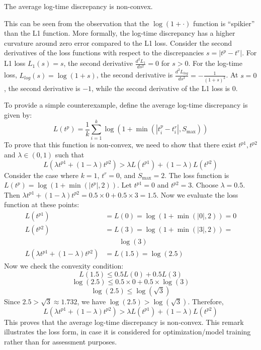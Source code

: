 \begin{ChSixRemark}
    The average log-time discrepancy is non-convex.
\end{ChSixRemark}
This can be seen from the observation that the $\log(1+\cdot)$ function is ``spikier'' than the L1 function.
More formally, the log-time discrepancy has a higher curvature around zero error compared to the L1 loss.
Consider the second derivatives of the loss functions with respect to the discrepancies $s = |t^p - t^r|$.
For L1 loss $L_1(s) = s$, the second derivative $\frac{d^2 L_1}{ds^2} = 0$ for $s > 0$.
For the log-time loss, $L_{log}(s) = \log(1 + s)$, the second derivative is $\frac{d^2 L_{log}}{ds^2} = -\frac{1}{(1 + s)^2}$.
At $s = 0$, the second derivative is $-1$, while the second derivative of the L1 loss is $0$.

To provide a simple counterexample, define the average log-time discrepancy is given by:
\[
L(t^p) = \frac{1}{k} \sum_{i=1}^k \log(1 + \min(|t^p_i - t^r_i|, S_{\text{max}}))
\]
To prove that this function is non-convex, we need to show that there exist $t^{p1}, t^{p2}$ and $\lambda \in (0,1)$ such that
\[
L(\lambda t^{p1} + (1-\lambda) t^{p2}) > \lambda L(t^{p1}) + (1-\lambda) L(t^{p2})
\]
Consider the case where $k=1$, $t^r = 0$, and $S_{\text{max}} = 2$.
The loss function is $L(t^p) = \log(1 + \min(|t^p|, 2))$.
Let $t^{p1} = 0$ and $t^{p2} = 3$.
Choose $\lambda = 0.5$.
Then $\lambda t^{p1} + (1-\lambda) t^{p2} = 0.5 \times 0 + 0.5 \times 3 = 1.5$.
Now we evaluate the loss function at these points:
\begin{align*}
L(t^{p1}) &= L(0) = \log(1 + \min(|0|, 2)) = 0 \\
L(t^{p2}) &= L(3) = \log(1 + \min(|3|, 2)) = \\
    & \qquad \log(3) \\
L(\lambda t^{p1} + (1-\lambda) t^{p2}) &= L(1.5) = \log(2.5)
\end{align*}
Now we check the convexity condition:
\[
L(1.5) \leq 0.5 L(0) + 0.5 L(3)
\]
\[
\log(2.5) \leq 0.5 \times 0 + 0.5 \times \log(3)
\]
\[
\log(2.5) \leq \log(\sqrt{3})
\]
Since $2.5 > \sqrt{3} \approx 1.732$, we have $\log(2.5) > \log(\sqrt{3})$.
Therefore,
\[
L(\lambda t^{p1} + (1-\lambda) t^{p2}) > \lambda L(t^{p1}) + (1-\lambda) L(t^{p2})
\]
This proves that the average log-time discrepancy is non-convex.
This remark illustrates the loss form, in case it is considered for optimization/model training rather than for assessment purposes.










